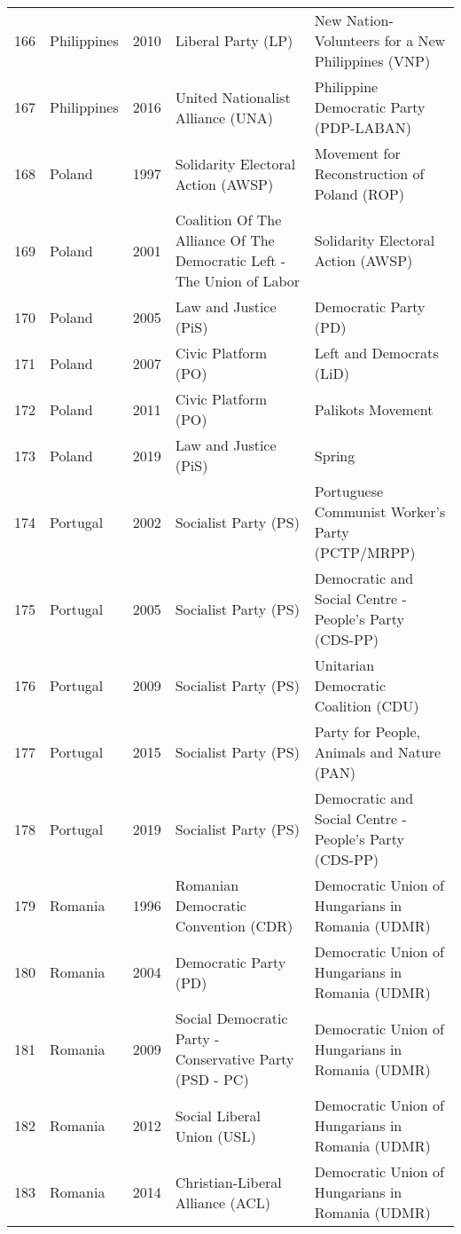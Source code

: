 \documentclass[12pt]{article}
\begin{document}
\begin{table}[ht]
\begin{footnotesize}
\begin{tabular}{rllll}
  166 & Philippines & 2010 &   Liberal Party (LP) &   New Nation- Volunteers for a New Philippines (VNP) \\ 
  167 & Philippines & 2016 &   United Nationalist Alliance (UNA) &   Philippine Democratic Party (PDP-LABAN) \\ 
  168 & Poland & 1997 &   Solidarity Electoral Action (AWSP) &   Movement for Reconstruction of Poland (ROP) \\ 
  169 & Poland & 2001 &   Coalition Of The Alliance Of The Democratic Left - The Union of  Labor &   Solidarity Electoral Action (AWSP) \\ 
  170 & Poland & 2005 &   Law and Justice (PiS) &   Democratic Party (PD) \\ 
  171 & Poland & 2007 &   Civic Platform (PO) &   Left and Democrats (LiD)  \\ 
  172 & Poland & 2011 &   Civic Platform (PO) &   Palikots Movement \\ 
  173 & Poland & 2019 &   Law and Justice (PiS) &   Spring \\ 
  174 & Portugal & 2002 &   Socialist Party (PS) &   Portuguese Communist Worker's Party (PCTP/MRPP) \\ 
  175 & Portugal & 2005 &   Socialist Party (PS) &   Democratic and Social Centre - People's Party (CDS-PP) \\ 
  176 & Portugal & 2009 &   Socialist Party (PS) &   Unitarian Democratic Coalition (CDU) \\ 
  177 & Portugal & 2015 &   Socialist Party (PS) &   Party for People, Animals and Nature (PAN) \\ 
  178 & Portugal & 2019 &   Socialist Party (PS) &   Democratic and Social Centre - People's Party (CDS-PP) \\ 
  179 & Romania & 1996 &   Romanian Democratic Convention (CDR) &   Democratic Union of Hungarians in Romania (UDMR) \\ 
  180 & Romania & 2004 &   Democratic Party (PD) &   Democratic Union of Hungarians in Romania (UDMR) \\ 
  181 & Romania & 2009 &   Social Democratic Party - Conservative Party (PSD - PC) &   Democratic Union of Hungarians in Romania (UDMR) \\ 
  182 & Romania & 2012 &   Social Liberal Union (USL) &   Democratic Union of Hungarians in Romania (UDMR) \\ 
  183 & Romania & 2014 &   Christian-Liberal Alliance (ACL) &   Democratic Union of Hungarians in Romania (UDMR) \\ 

\end{tabular}
\end{footnotesize}
\end{table}
\end{document}
